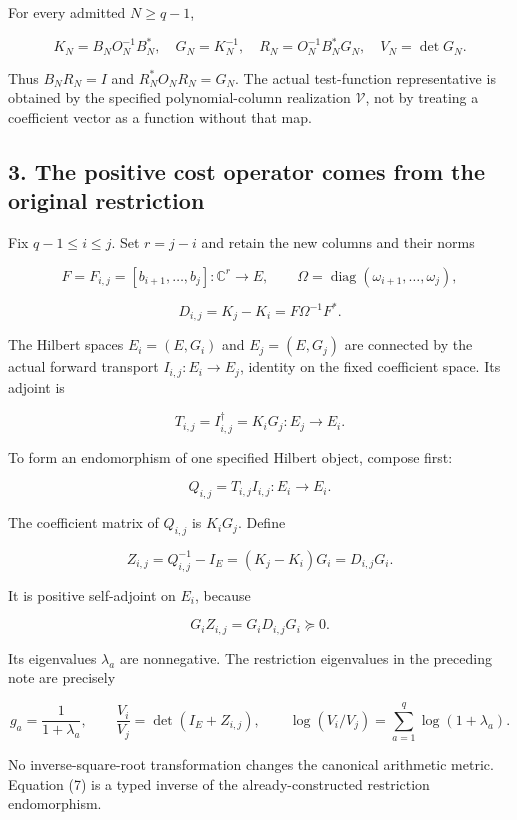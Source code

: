 \documentclass[
  11pt,
]{article}
\begin{document}
For every admitted \(N\ge q-1\),

\[
 K_N=B_NO_N^{-1}B_N^*,\quad G_N=K_N^{-1},\quad
 R_N=O_N^{-1}B_N^*G_N,\quad V_N=\det G_N.                         \tag{5}
\]

Thus \(B_NR_N=I\) and \(R_N^*O_NR_N=G_N\). The actual test-function
representative is obtained by the specified polynomial-column
realization \(\mathcal V\), not by treating a coefficient vector as a
function without that map.

\subsection{3. The positive cost operator comes from the original
restriction}\label{the-positive-cost-operator-comes-from-the-original-restriction}

Fix \(q-1\le i\le j\). Set \(r=j-i\) and retain the new columns and
their norms

\[
 F=F_{i,j}=[b_{i+1},\ldots,b_j]:\mathbb C^r\to E,\qquad
 \Omega=\operatorname{diag}(\omega_{i+1},\ldots,\omega_j),
\]

\[
 D_{i,j}=K_j-K_i=F\Omega^{-1}F^*.                                \tag{6}
\]

The Hilbert spaces \(E_i=(E,G_i)\) and \(E_j=(E,G_j)\) are connected by
the actual forward transport \(I_{i,j}:E_i\to E_j\), identity on the
fixed coefficient space. Its adjoint is

\[
 T_{i,j}=I_{i,j}^{\dagger}=K_iG_j:E_j\to E_i.
\]

To form an endomorphism of one specified Hilbert object, compose first:

\[
 Q_{i,j}=T_{i,j}I_{i,j}:E_i\to E_i.
\]

The coefficient matrix of \(Q_{i,j}\) is \(K_iG_j\). Define

\[
 \boxed{Z_{i,j}=Q_{i,j}^{-1}-I_E=(K_j-K_i)G_i=D_{i,j}G_i.}       \tag{7}
\]

It is positive self-adjoint on \(E_i\), because

\[
 G_iZ_{i,j}=G_iD_{i,j}G_i\succeq0.
\]

Its eigenvalues \(\lambda_a\) are nonnegative. The restriction
eigenvalues in the preceding note are precisely

\[
 g_a=\frac1{1+\lambda_a},\qquad
 \frac{V_i}{V_j}=\det(I_E+Z_{i,j}),\qquad
 \log(V_i/V_j)=\sum_{a=1}^{q}\log(1+\lambda_a).                 \tag{8}
\]

No inverse-square-root transformation changes the canonical arithmetic
metric. Equation (7) is a typed inverse of the already-constructed
restriction endomorphism.
\end{document}
